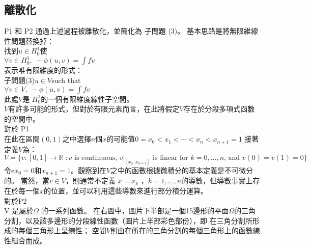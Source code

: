 \begin{itemize}
\subsection{離散化}

P1 和 P2 通過上述過程被離散化，並簡化為 子問題 (3)。 基本思路是將無限維線性問題替換掉：\\

    找到$ {\displaystyle u\in H_{0}^{1}} $使\\
	
    $ {\displaystyle \forall v\in H_{0}^{1},\;-\phi (u,v)=\int fv}$\\

表示唯有限維度的形式：\\

    子問題(3)$ {\displaystyle u\in V} $such that\\
	
    $ {\displaystyle \forall v\in V,\;-\phi (u,v)=\int fv}$\\
	
此處$ V $是 ${\displaystyle H_{0}^{1}}$的一個有限維度線性子空間。\\

$ V$有許多可能的形式，但對於有限元素而言，在此將假定$ V$存在於分段多項式函數的空間中。 \\

對於 P1\\

在此在區間$ (0,1)$之中選擇$ n$個$ x$的可能值$ {\displaystyle 0=x_{0}<x_{1}<\cdots <x_{n}<x_{n+1}=1}$ 接著定義$ V $為：\\

$ {\displaystyle V=\{v:[0,1]\rightarrow \mathbb {R} \;:v{\mbox{ is continuous, }}v|_{[x_{k},x_{k+1}]}{\mbox{ is linear for }}k=0,\dots ,n{\mbox{, and }}v(0)=v(1)=0\}}$\\

令e$ x_0=0 $和$ {\displaystyle x_{n+1}=1}$。觀察到在$ V $之中的函數根據微積分的基本定義是不可微分的。 當然，當$v \in V$，則通常不定義 $ {\displaystyle x=x_{k}}$ ，${\displaystyle k=1,\ldots ,n}$的導數，但導數事實上存在於每一個$ x$的位置，並可以利用這些導數來進行部分積分運算。 \\

對於P2\\

V 是屬於$ \Omega$ 的一系列函數。 在右圖中，圖片下半部是一個15邊形的平面$ \Omega $的三角分割，以及該多邊形的分段線性函數（圖片上半部彩色部份），即 在三角分割所形成的每個三角形上呈線性； 空間$ V$則由在所在的三角分割的每個三角形上的函數線性組合而成。\\


\end{itemize}
